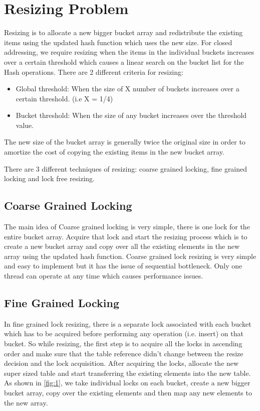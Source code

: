 \documentclass[twoside]{article}
\begin{document}
\section{Resizing Problem}
Resizing is to allocate a new bigger bucket array and redistribute the existing items using the updated hash function which uses the new size. For closed addressing, we require resizing when the items in the individual buckets increases over a certain threshold which causes a linear search on the bucket list for the Hash operations. There are 2 different criteria for resizing:
\begin{itemize}
    \item Global threshold: When the size of X number of buckets increases over a certain threshold. (i.e X = 1/4)  
    \item Bucket threshold: When the size of any bucket increases over the threshold value.
\end{itemize} 
The new size of the bucket array is generally twice the original size in order to amortize the cost of copying the existing items in the new bucket array. 

There are 3 different techniques of resizing: coarse grained locking, fine grained locking and lock free resizing.
\subsection{Coarse Grained Locking}
The main idea of Coarse grained locking is very simple, there is one lock for the entire bucket array. Acquire that lock and start the resizing process which is to create a new bucket array and copy over all the existing elements in the new array using the updated hash function. 
Coarse grained lock resizing is very simple and easy to implement but it has the issue of sequential bottleneck. Only one thread can operate at any time which causes performance issues.



\subsection{Fine Grained Locking}
In fine grained lock resizing, there is a separate lock associated with each bucket which has to be acquired before performing any operation (i.e. insert) on that bucket. So while resizing, the first step is to acquire all the locks in ascending order and make sure that the table reference didn't change between the resize decision and the lock acquisition. After acquiring the locks, allocate the new super sized table and start transferring the existing elements into the new table. As shown in \ref{fig:1}, we take individual locks on each bucket, create a new bigger bucket array, copy over the existing elements and then map any new elements to the new array. 
\end{document}
